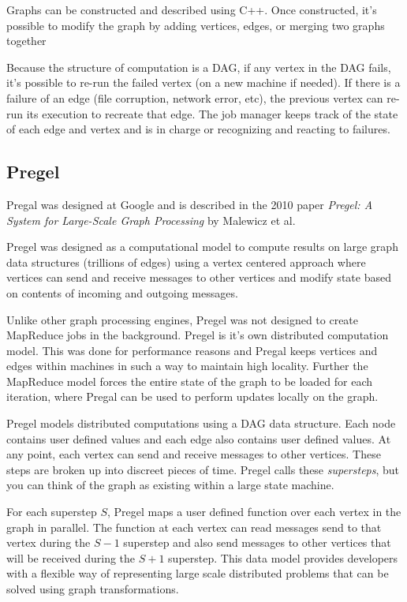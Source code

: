 \documentclass[]{article}
\begin{document}
Graphs can be constructed and described using C++. Once constructed, it's possible to modify the graph by adding vertices, edges, or merging two graphs together

Because the structure of computation is a DAG, if any vertex in the DAG fails, it's possible to re-run the failed vertex (on a new machine if needed). If there is a failure of an edge (file corruption, network error, etc), the previous vertex can re-run its execution to recreate that edge. The job manager keeps track of the state of each edge and vertex and is in charge or recognizing and reacting to failures.

\subsection{Pregel}\label{ssec:pregel}
Pregal was designed at Google and is described in the 2010 paper \textit{Pregel: A System for Large-Scale Graph Processing}\cite{malewicz_pregel:_2010} by Malewicz et al. 

Pregel was designed as a computational model to compute results on large graph data structures (trillions of edges) using a vertex centered approach where vertices can send and receive messages to other vertices and modify state based on contents of incoming and outgoing messages. 

Unlike other graph processing engines, Pregel was not designed to create MapReduce jobs in the background. Pregel is it's own distributed computation model. This was done for performance reasons and Pregal keeps vertices and edges within machines in such a way to maintain high locality. Further the MapReduce model forces the entire state of the graph to be loaded for each iteration, where Pregal can be used to perform updates locally on the graph.

Pregel models distributed computations using a DAG data structure. Each node contains user defined values and each edge also contains user defined values. At any point, each vertex can send and receive messages to other vertices. These steps are broken up into discreet pieces of time. Pregel calls these \textit{supersteps}, but you can think of the graph as existing within a large state machine.

For each superstep $S$, Pregel maps a user defined function over each vertex in the graph in parallel. The function at each vertex can read messages send to that vertex during the $S-1$ superstep and also send messages to other vertices that will be received during the $S+1$ superstep. This data model provides developers with a flexible way of representing large scale distributed problems that can be solved using graph transformations. 
\end{document}
